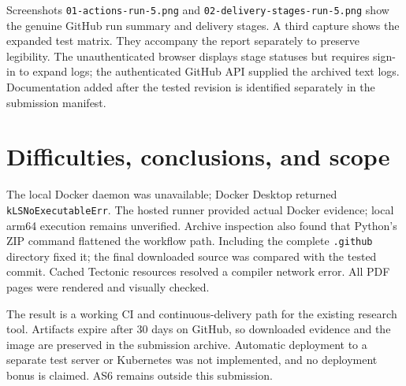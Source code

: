 Screenshots \texttt{01-actions-run-5.png} and \texttt{02-delivery-stages-run-5.png} show the genuine GitHub run summary and delivery stages. A third capture shows the expanded test matrix. They accompany the report separately to preserve legibility. The unauthenticated browser displays stage statuses but requires sign-in to expand logs; the authenticated GitHub API supplied the archived text logs. Documentation added after the tested revision is identified separately in the submission manifest.

\section{Difficulties, conclusions, and scope}
The local Docker daemon was unavailable; Docker Desktop returned \texttt{kLSNoExecutableErr}. The hosted runner provided actual Docker evidence; local arm64 execution remains unverified. Archive inspection also found that Python's ZIP command flattened the workflow path. Including the complete \texttt{.github} directory fixed it; the final downloaded source was compared with the tested commit. Cached Tectonic resources resolved a compiler network error. All PDF pages were rendered and visually checked.

The result is a working CI and continuous-delivery path for the existing research tool. Artifacts expire after 30 days on GitHub, so downloaded evidence and the image are preserved in the submission archive. Automatic deployment to a separate test server or Kubernetes was not implemented, and no deployment bonus is claimed. AS6 remains outside this submission.

